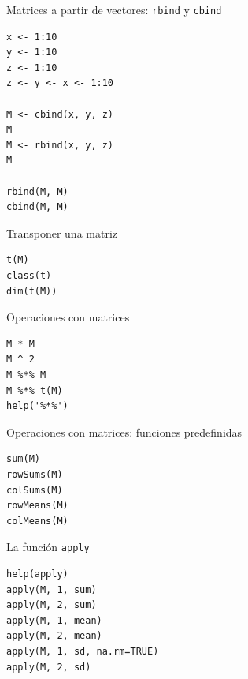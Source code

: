 \documentclass[xcolor={usenames,svgnames,dvipsnames}]{beamer}
\begin{document}
\begin{frame}[fragile,label=sec-2-2-2]{Matrices a partir de vectores: \texttt{rbind} y \texttt{cbind}}
 \lstset{language=R,label= ,caption= ,numbers=none}
\begin{lstlisting}
x <- 1:10
y <- 1:10
z <- 1:10
z <- y <- x <- 1:10

M <- cbind(x, y, z)
M
M <- rbind(x, y, z)
M

rbind(M, M)
cbind(M, M)
\end{lstlisting}
\end{frame}

\begin{frame}[fragile,label=sec-2-2-3]{Transponer una matriz}
 \lstset{language=R,label= ,caption= ,numbers=none}
\begin{lstlisting}
t(M)
class(t)
dim(t(M))
\end{lstlisting}
\end{frame}

\begin{frame}[fragile,label=sec-2-2-4]{Operaciones con matrices}
 \lstset{language=R,label= ,caption= ,numbers=none}
\begin{lstlisting}
M * M
M ^ 2
M %*% M
M %*% t(M)
help('%*%')
\end{lstlisting}
\end{frame}

\begin{frame}[fragile,label=sec-2-2-5]{Operaciones con matrices: funciones predefinidas}
 \lstset{language=R,label= ,caption= ,numbers=none}
\begin{lstlisting}
sum(M)
rowSums(M)
colSums(M)
rowMeans(M)
colMeans(M)
\end{lstlisting}
\end{frame}

\begin{frame}[fragile,label=sec-2-2-6]{La función \texttt{apply}}
 \lstset{language=R,label= ,caption= ,numbers=none}
\begin{lstlisting}
help(apply)
apply(M, 1, sum)
apply(M, 2, sum)
apply(M, 1, mean)
apply(M, 2, mean)
apply(M, 1, sd, na.rm=TRUE)
apply(M, 2, sd)
\end{lstlisting}
\end{frame}
\end{document}
